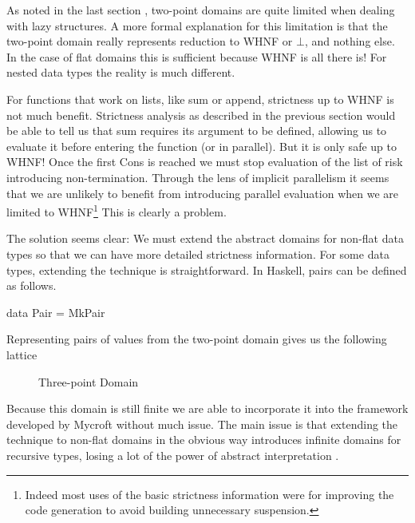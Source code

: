 As noted in the last section , two-point domains are
quite limited when dealing with lazy structures. A more formal explanation for
this limitation is that the two-point domain really represents reduction to
WHNF or $\bot$, and nothing else. In the case of flat domains this is
sufficient because WHNF is all there is! For nested data types the reality is
much different. 

For functions that work on lists, like \<sum\> or \<append\>, strictness up to
WHNF is not much benefit. Strictness analysis as described in the previous
section would be able to tell us that \<sum\> requires its argument to be
defined, allowing us to evaluate it before entering the function (or in
parallel). But it is only safe up to WHNF! Once the first \<Cons\> is reached
we must stop evaluation of the list of risk introducing non-termination.
Through the lens of implicit parallelism it seems that we are unlikely to
benefit from introducing parallel evaluation when we are limited to
WHNF\footnote{Indeed most uses of the basic strictness information were for
improving the code generation to avoid building unnecessary suspension.} This
is clearly a problem.

The solution seems clear: We must extend the abstract domains for non-flat data
types so that we can have more detailed strictness information. For some data
types, extending the technique is straightforward. In Haskell, pairs can be
defined as follows.

\begin{haskell*}
data Pair \alpha \beta = MkPair \alpha \beta
\end{haskell*}

Representing pairs of values from the two-point domain gives us the following
lattice


\begin{figure}
\centering
{}
\caption{Three-point Domain}
\label{fig:threepoint}
\end{figure}

Because this domain is still finite we are able to incorporate it into the
framework developed by Mycroft without much issue.  The main issue is that
extending the technique to non-flat domains in the obvious way introduces
infinite domains for recursive types, losing a lot of the power of abstract
interpretation .

